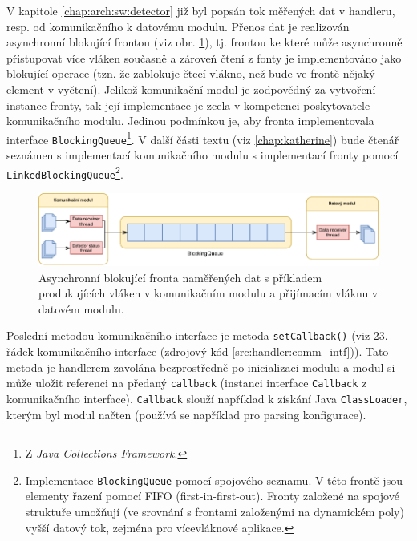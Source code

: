 V kapitole \ref{chap:arch:sw:detector} již byl popsán tok měřených dat v handleru, resp. od komunikačního k datovému modulu. Přenos dat je realizován asynchronní blokující frontou (viz obr. \ref{fig:handler:data_queue}), tj. frontou ke které může asynchronně přistupovat více vláken současně a zároveň čtení z fonty je implementováno jako blokující operace (tzn. že zablokuje čtecí vlákno, než bude ve frontě nějaký element v vyčtení). Jelikož komunikační modul je zodpovědný za vytvoření instance fronty, tak její implementace je zcela v kompetenci poskytovatele komunikačního modulu. Jedinou podmínkou je, aby fronta implementovala interface \texttt{BlockingQueue}\footnote{Z \textit{Java Collections Framework}.}. V další části textu (viz \ref{chap:katherine}) bude čtenář seznámen s implementací komunikačního modulu s implementací fronty pomocí \texttt{LinkedBlockingQueue}\footnote{Implementace \texttt{BlockingQueue} pomocí spojového seznamu. V této frontě jsou elementy řazení pomocí FIFO (first-in-first-out). Fronty založené na spojové struktuře umožňují (ve srovnání s frontami založenými na dynamickém poly) vyšší datový tok, zejména pro vícevláknové aplikace.}.
\begin{figure}[h]
	\begin{center}
		\vspace*{0.5cm}
		\includegraphics[width=14.5cm]{figures/handler_data_queue.pdf}
		\caption{Asynchronní blokující fronta naměřených dat s příkladem produkujících vláken v komunikačním modulu a přijímacím vláknu v datovém modulu.}
		\label{fig:handler:data_queue}
	\end{center}
\end{figure}

Poslední metodou komunikačního interface je metoda \texttt{setCallback()} (viz 23. řádek komunikačního interface (zdrojový kód \ref{src:handler:comm_intf})). Tato metoda je handlerem zavolána bezprostředně po inicializaci modulu a modul si může uložit referenci na předaný \texttt{callback} (instanci interface \texttt{Callback} z komunikačního interface). \texttt{Callback} slouží například k získání Java \texttt{ClassLoader}, kterým byl modul načten (používá se například pro parsing konfigurace).

